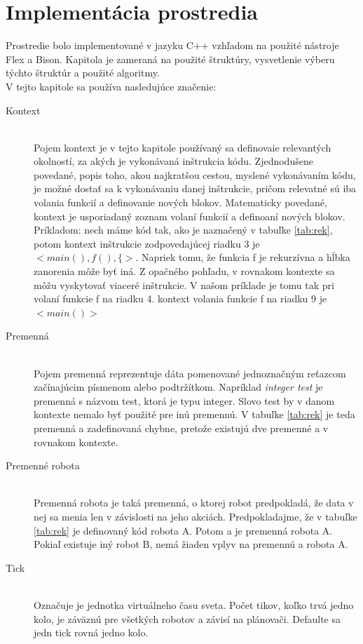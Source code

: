 \chapter{Implementácia prostredia}
Prostredie bolo implementované v jazyku C++ vzhľadom na použité nástroje Flex a Bison. Kapitola je zameraná na použité štruktúry, vysvetlenie výberu týchto štruktúr a použité algoritmy.\\
V tejto kapitole sa používa nasledujúce značenie:
\begin{description}
\item[Kontext]\hfill \\
	Pojem kontext je v tejto kapitole používaný sa definovaie relevantých okolností, za akých je vykonávaná inštrukcia kódu. Zjednodušene povedané, popis toho, akou najkratšou cestou, myslené vykonávaním kódu, je možné dostať sa k vykonávaniu danej inštrukcie, pričom relevatné sú iba volania funkcií a definovanie nových blokov. Matematicky povedané, kontext je usporiadaný zoznam volaní funkcií a definoaní nových blokov. Príkladom: nech máme kód tak, ako je naznačený v tabuľke \ref{tab:rek}, potom kontext inštrukcie zodpovedajúcej riadku 3 je $<main(),f(),\{>$. Napriek tomu, že funkcia f je rekurzívna a hĺbka zanorenia môže byť iná. Z opačného pohľadu, v rovnakom kontexte sa môžu vyskytovať viaceré inštrukcie. V našom príklade je tomu tak pri volaní funkcie f na riadku 4. kontext volania  funkcie f na riadku 9 je $<main()>$
\item[Premenná] \hfill \\
	Pojem premenná reprezentuje dáta pomenované jednoznačným reťazcom začínajúcim písmenom alebo podtržítkom. Napríklad \emph{integer test} je premenná s názvom test, ktorá je typu integer. Slovo test by v danom kontexte nemalo byť použité pre inú premennú. V tabuľke \ref{tab:rek} je teda premenná a zadefinovaná chybne, pretože existujú dve premenné a v rovnakom kontexte.
\item[Premenné robota]\hfill \\
Premenná robota je taká premenná, o ktorej robot predpokladá, že data v nej sa menia len v závislosti na jeho akciách. Predpokladajme, že v tabuľke \ref{tab:rek} je definovaný kód robota A. Potom a je premenná robota A. Pokiaľ existuje iný robot B, nemá žiaden vplyv na premennú a robota A.
\item [Tick] \hfill \\
	Označuje je jednotka virtuálneho času sveta. Počet tikov, koľko trvá jedno kolo, je záväznú pre všetkých robotov a závisí na plánovači. Defaulte sa jedn tick rovná jedno kolo.

\end{description}
